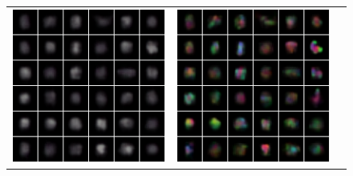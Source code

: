 \begin{figure}[tbp]
\begin{center}
\begin{tabular}{ccc}
      \begin{minipage}{0.33\linewidth}
        \begin{center}
          \includegraphics[width=\linewidth]{./figures/proposal1200.png}
        \end{center}
      \end{minipage}&
      \begin{minipage}{0.33\linewidth}
        \begin{center}
          \includegraphics[width=\linewidth]{./figures/proposal3100.png}

\end{center}
\end{minipage}
\end{tabular}
\end{center}
\end{figure}

